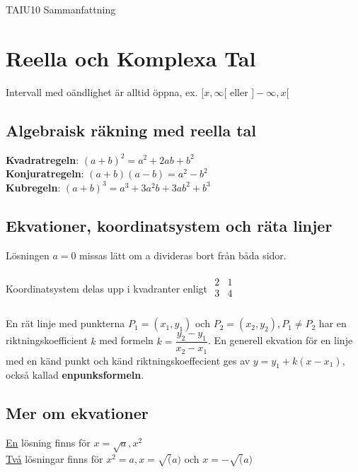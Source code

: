 \documentclass{article}
\begin{document}
\begin{center}
\begin{huge}
TAIU10 Sammanfattning

\end{huge}
\end{center}
\section{Reella och Komplexa Tal}
Intervall med oändlighet är alltid öppna, ex. $[x, \infty[$ eller $]-\infty, x[$\\

\setcounter{subsection}{1}
\subsection{Algebraisk räkning med reella tal}
\textbf{Kvadratregeln}: $(a + b)^{2} = a^{2} + 2ab + b^{2}$\\
\textbf{Konjuratregeln}: $(a + b)(a - b) = a^{2} - b^{2}$\\
\textbf{Kubregeln}: $(a + b)^{3} = a^{3} + 3a^{2}b + 3ab^{2} + b^3$\\

\subsection{Ekvationer, koordinatsystem och räta linjer}
 Lösningen $a = 0$ missas lätt om a divideras bort från båda sidor.\\
\\
Koordinatsystem delas upp i kvadranter enligt
$\begin{array}{c|c}
2 & 1 \\
\hline
3 & 4 \\
\end{array}$\\
\\
En rät linje med punkterna $P_1 = (x_1, y_1)$ och $P_2 = (x_2, y_2), P_1 \neq P_2$ har en riktningskoefficient $k$  med formeln $k = \dfrac{y_2 - y_1}{x_2 - x_1}$. En generell ekvation för en linje med en känd punkt och känd riktningskoeffecient ges av $y = y_1 + k(x - x_1)$, också kallad \textbf{enpunksformeln}.

\subsection{Mer om ekvationer}
\underline{En} lösning finns för $x = \sqrt{a}, x^2$\\
\underline{Två} lösningar finns för $x^2 = a, x = \sqrt(a)$ och $x = -\sqrt(a)$
\end{document}
